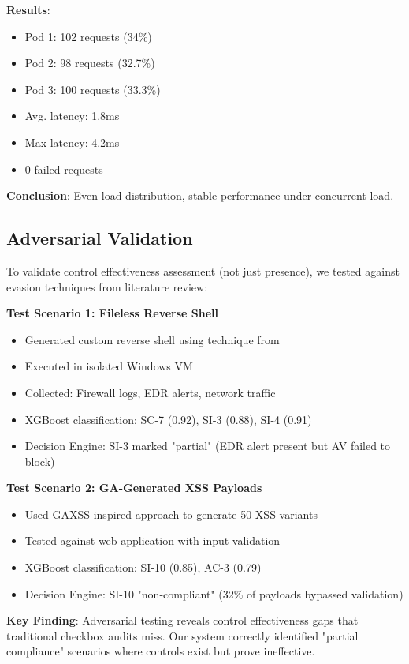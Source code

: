 \documentclass[11pt,conference]{IEEEtran}
\begin{document}
\textbf{Results}:
\begin{itemize}
    \item Pod 1: 102 requests (34\%)
    \item Pod 2: 98 requests (32.7\%)
    \item Pod 3: 100 requests (33.3\%)
    \item Avg. latency: 1.8ms
    \item Max latency: 4.2ms
    \item 0 failed requests
\end{itemize}

\textbf{Conclusion}: Even load distribution, stable performance under concurrent load.

\subsection{Adversarial Validation}

To validate control effectiveness assessment (not just presence), we tested against evasion techniques from literature review:

\textbf{Test Scenario 1: Fileless Reverse Shell}
\begin{itemize}
    \item Generated custom reverse shell using technique from \cite{reverse_shell_paper}
    \item Executed in isolated Windows VM
    \item Collected: Firewall logs, EDR alerts, network traffic
    \item XGBoost classification: SC-7 (0.92), SI-3 (0.88), SI-4 (0.91)
    \item Decision Engine: SI-3 marked "partial" (EDR alert present but AV failed to block)
\end{itemize}

\textbf{Test Scenario 2: GA-Generated XSS Payloads}
\begin{itemize}
    \item Used GAXSS-inspired approach \cite{ga_xss_paper} to generate 50 XSS variants
    \item Tested against web application with input validation
    \item XGBoost classification: SI-10 (0.85), AC-3 (0.79)
    \item Decision Engine: SI-10 "non-compliant" (32\% of payloads bypassed validation)
\end{itemize}

\textbf{Key Finding}: Adversarial testing reveals control effectiveness gaps that traditional checkbox audits miss. Our system correctly identified "partial compliance" scenarios where controls exist but prove ineffective.
\end{document}
